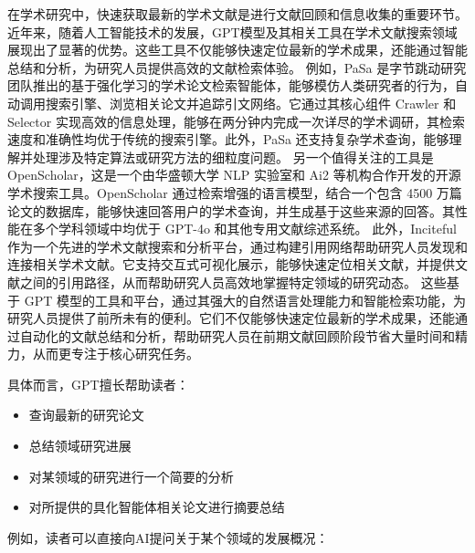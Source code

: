 在学术研究中，快速获取最新的学术文献是进行文献回顾和信息收集的重要环节。近年来，随着人工智能技术的发展，GPT模型及其相关工具在学术文献搜索领域展现出了显著的优势。这些工具不仅能够快速定位最新的学术成果，还能通过智能总结和分析，为研究人员提供高效的文献检索体验。
例如，PaSa 是字节跳动研究团队推出的基于强化学习的学术论文检索智能体，能够模仿人类研究者的行为，自动调用搜索引擎、浏览相关论文并追踪引文网络。它通过其核心组件 Crawler 和 Selector 实现高效的信息处理，能够在两分钟内完成一次详尽的学术调研，其检索速度和准确性均优于传统的搜索引擎。此外，PaSa 还支持复杂学术查询，能够理解并处理涉及特定算法或研究方法的细粒度问题。
另一个值得关注的工具是 OpenScholar，这是一个由华盛顿大学 NLP 实验室和 Ai2 等机构合作开发的开源学术搜索工具。OpenScholar 通过检索增强的语言模型，结合一个包含 4500 万篇论文的数据库，能够快速回答用户的学术查询，并生成基于这些来源的回答。其性能在多个学科领域中均优于 GPT-4o 和其他专用文献综述系统。
此外，Inciteful 作为一个先进的学术文献搜索和分析平台，通过构建引用网络帮助研究人员发现和连接相关学术文献。它支持交互式可视化展示，能够快速定位相关文献，并提供文献之间的引用路径，从而帮助研究人员高效地掌握特定领域的研究动态。
这些基于 GPT 模型的工具和平台，通过其强大的自然语言处理能力和智能检索功能，为研究人员提供了前所未有的便利。它们不仅能够快速定位最新的学术成果，还能通过自动化的文献总结和分析，帮助研究人员在前期文献回顾阶段节省大量时间和精力，从而更专注于核心研究任务。

具体而言，GPT擅长帮助读者：
\begin{itemize}
    \item 查询最新的研究论文
    \item 总结领域研究进展
    \item 对某领域的研究进行一个简要的分析
    \item 对所提供的具化智能体相关论文进行摘要总结
\end{itemize}

例如，读者可以直接向AI提问关于某个领域的发展概况：

